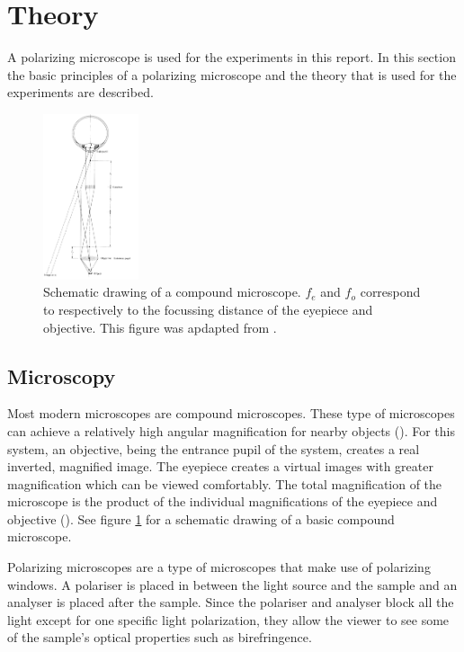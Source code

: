\section{Theory}

A polarizing microscope is used for the experiments in this report. In this section the basic principles of a polarizing microscope and the theory that is used for the experiments are described.

\begin{figure}
    \includegraphics[width=0.25\textwidth]{afbeeldingen/compound_microscope.png}
  	\caption{Schematic drawing of a compound microscope. $f_{e}$ and $f_{o}$ correspond to respectively to the focussing distance of the eyepiece and objective. This figure was apdapted from \cite{hecht}.}
  	\label{fig_compound_microscope}
\end{figure} 

\subsection{Microscopy}

Most modern microscopes are compound microscopes. These type of microscopes can achieve a relatively high angular magnification for nearby objects (\cite{hecht}). For this system, an objective, being the entrance pupil of the system, creates a real inverted, magnified image. The eyepiece creates a virtual images with greater magnification which can be viewed comfortably. The total magnification of the microscope is the product of the individual magnifications of the eyepiece and objective (\cite{hecht}). See figure \ref{fig_compound_microscope} for a schematic drawing of a basic compound microscope.

Polarizing microscopes are a type of microscopes that make use of polarizing windows. A polariser is placed in between the light source and the sample and an analyser is placed after the sample. Since the polariser and analyser block all the light except for one specific light polarization, they allow the viewer to see some of the sample's optical properties such as birefringence. 

